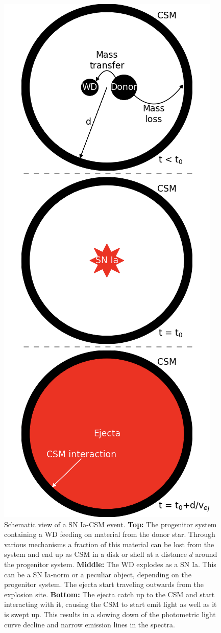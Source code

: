 \documentclass[a4paper,oneside,12pt, class=Latex/Classes/PhDthesisPSnPDF, crop=false]{standalone}
\begin{document}
\begin{figure}
    \centering
    \includegraphics[height=0.847\textheight]{../Images/chapter_1/CSM_sketch_vert.png}
    \caption{Schematic view of a SN Ia-CSM event. \textbf{Top:} The progenitor system containing a WD feeding on material from the donor star. Through various mechanisms a fraction of this material can be lost from the system and end up as CSM in a disk or shell at a distance $d$ around the progenitor system. \textbf{Middle:} The WD explodes as a SN Ia. This can be a SN Ia-norm or a peculiar object, depending on the progenitor system. The ejecta start traveling outwards from the explosion site. \textbf{Bottom:} The ejecta catch up to the CSM and start interacting with it, causing the CSM to start emit light as well as it is swept up. This results in a slowing down of the photometric light curve decline and narrow emission lines in the spectra.}
    \label{Ia-CSM_mod}
\end{figure}
\end{document}
